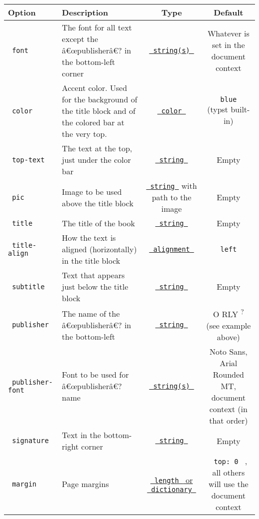 \begin{longtable}[]{@{}llcc@{}}
\toprule\noalign{}
Option & Description & Type & Default \\
\midrule\noalign{}
\endhead
\bottomrule\noalign{}
\endlastfoot
\texttt{\ font\ } & The font for all text except the â€œpublisherâ€? in
the bottom-left corner &
\href{https://typst.app/docs/reference/text/text/\#parameters-font}{\texttt{\ string(s)\ }}
& Whatever is set in the document context \\
\texttt{\ color\ } & Accent color. Used for the background of the title
block and of the colored bar at the very top. &
\href{https://typst.app/docs/reference/visualize/color/}{\texttt{\ color\ }}
& \texttt{\ blue\ } (typst built-in) \\
\texttt{\ top-text\ } & The text at the top, just under the color bar &
\href{https://typst.app/docs/reference/foundations/str/}{\texttt{\ string\ }}
& Empty \\
\texttt{\ pic\ } & Image to be used above the title block &
\href{https://typst.app/docs/reference/visualize/image/\#parameters-path}{\texttt{\ string\ }}
with path to the image & Empty \\
\texttt{\ title\ } & The title of the book &
\href{https://typst.app/docs/reference/foundations/str/}{\texttt{\ string\ }}
& Empty \\
\texttt{\ title-align\ } & How the text is aligned (horizontally) in the
title block &
\href{https://typst.app/docs/reference/layout/alignment/}{\texttt{\ alignment\ }}
& \texttt{\ left\ } \\
\texttt{\ subtitle\ } & Text that appears just below the title block &
\href{https://typst.app/docs/reference/foundations/str/}{\texttt{\ string\ }}
& Empty \\
\texttt{\ publisher\ } & The name of the â€œpublisherâ€? in the
bottom-left &
\href{https://typst.app/docs/reference/foundations/str/}{\texttt{\ string\ }}
& O RLY \textsuperscript{?} (see example above) \\
\texttt{\ publisher-font\ } & Font to be used for â€œpublisherâ€? name &
\href{https://typst.app/docs/reference/text/text/\#parameters-font}{\texttt{\ string(s)\ }}
& Noto Sans, Arial Rounded MT, document context (in that order) \\
\texttt{\ signature\ } & Text in the bottom-right corner &
\href{https://typst.app/docs/reference/foundations/str/}{\texttt{\ string\ }}
& Empty \\
\texttt{\ margin\ } & Page margins &
\href{https://typst.app/docs/reference/layout/page/\#parameters-margin}{\texttt{\ length\ }
or \texttt{\ dictionary\ }} & \texttt{\ top:\ 0\ } , all others will use
the document context \\
\end{longtable}

